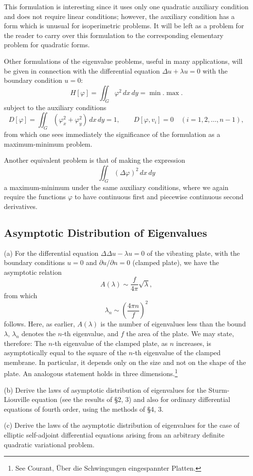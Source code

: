 This formulation is interesting since it uses only one quadratic auxiliary condition and does not require linear conditions; however, the auxiliary condition has a form which is unusual for isoperimetric problems. It will be left as a problem for the reader to carry over this formulation to the corresponding elementary problem for quadratic forms.

Other formulations of the eigenvalue problems, useful in many applications, will be given in connection with the differential equation $\Delta u+\lambda u=0$ with the boundary condition $u=0$:
\[
H[\varphi]=\iint_G\varphi^2\,dx\,dy=\min.\max.
\]
subject to the auxiliary conditions
\[
D[\varphi]=\iint_G(\varphi_x^2+\varphi_y^2)\,dx\,dy=1,
\qquad
D[\varphi,v_i]=0\quad(i=1,2,\ldots,n-1),
\]
from which one sees immediately the significance of the formulation as a maximum-minimum problem.

Another equivalent problem is that of making the expression
\[
\iint_G(\Delta\varphi)^2\,dx\,dy
\]
a maximum-minimum under the same auxiliary conditions, where we again require the functions $\varphi$ to have continuous first and piecewise continuous second derivatives.

\subsection{Asymptotic Distribution of Eigenvalues}
(a) For the differential equation $\Delta\Delta u-\lambda u=0$ of the vibrating plate, with the boundary conditions $u=0$ and $\partial u/\partial n=0$ (clamped plate), we have the asymptotic relation
\[
A(\lambda)\sim\frac{f}{4\pi}\sqrt\lambda,
\]
from which
\[
\lambda_n\sim\left(\frac{4\pi n}{f}\right)^2
\]
follows. Here, as earlier, $A(\lambda)$ is the number of eigenvalues less than the bound $\lambda$, $\lambda_n$ denotes the $n$-th eigenvalue, and $f$ the area of the plate. We may state, therefore: The $n$-th eigenvalue of the clamped plate, as $n$ increases, is asymptotically equal to the square of the $n$-th eigenvalue of the clamped membrane. In particular, it depends only on the size and not on the shape of the plate. An analogous statement holds in three dimensions.\footnote{See Courant, Über die Schwingungen eingespannter Platten.}

(b) Derive the laws of asymptotic distribution of eigenvalues for the Sturm-Liouville equation (see the results of \S2, 3) and also for ordinary differential equations of fourth order, using the methods of \S4, 3.

(c) Derive the laws of the asymptotic distribution of eigenvalues for the case of elliptic self-adjoint differential equations arising from an arbitrary definite quadratic variational problem.

